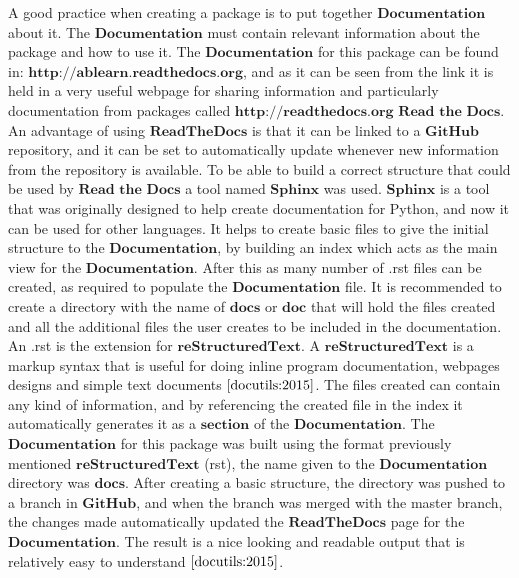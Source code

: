 A good practice when creating a package is to put together $\textbf{Documentation}$ about it. The $\textbf{Documentation}$ must contain relevant information about the package and how to use it. The $\textbf{Documentation}$ for this package can be found in:  $\textbf{http://ablearn.readthedocs.org}$, and as it can be seen from the link it is held in a very useful webpage for sharing information and particularly documentation from packages called $\textbf{http://readthedocs.org}$ $\textbf{Read the Docs}$. An advantage of using $\textbf{ReadTheDocs}$ is that it can be linked to a $\textbf{GitHub}$ repository, and it can be set to automatically update whenever new information from the repository is available.  To be able to build a correct structure that could be used by $\textbf{Read the Docs}$ a tool named  $\textbf{Sphinx}$ was used. $\textbf{Sphinx}$ is a tool that was originally designed to help create documentation for Python, and now it can be used for other languages. It helps to create basic files to give the initial structure to the $\textbf{Documentation}$, by building an index which acts as the main view for the $\textbf{Documentation}$. After this as many number of .rst files can be created, as required to populate the $\textbf{Documentation}$ file. It is recommended to create a directory with the name of $\textbf{docs}$ or $\textbf{doc}$ that will hold the files created and all the additional files the user creates to be included in the documentation. An .rst is the extension  for  $\textbf{reStructuredText}$. A $\textbf{reStructuredText}$ is a markup syntax that is useful for doing inline program documentation, webpages designs and simple text documents $\cite{docutils:2015}$. The files created can contain any kind of information, and by referencing the created file in the index it automatically generates it as a $\textbf{section}$ of the $\textbf{Documentation}$. 
The  $\textbf{Documentation}$ for this package was built using the format previously mentioned $\textbf{reStructuredText}$ (rst), the name given to the $\textbf{Documentation}$ directory was $\textbf{docs}$. After creating a basic structure, the directory was pushed to a branch in $\textbf{GitHub}$, and when the branch was merged with the master branch, the changes made automatically updated the $\textbf{ReadTheDocs}$ page for the $\textbf{Documentation}$. The result is a nice looking and readable output that is relatively easy to understand $\cite{docutils:2015}$. 
